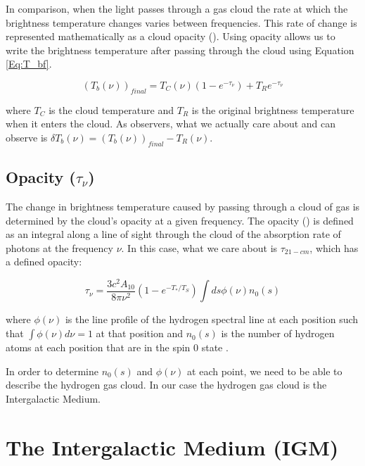 In comparison, when the light passes through a gas cloud the rate at which the brightness temperature changes varies between frequencies. This rate of change is represented mathematically as a cloud opacity (\tu). Using opacity allows us to write the brightness temperature after passing through the cloud using Equation \ref{Eq:T_bf}. 

\begin{equation}\label{Eq:T_bf}
(T_b (\nu))_{final}= T_{C} (\nu) (1-e^{-\tau_\nu}) +T_{R} e^{-\tau_\nu}
\end{equation}

where $T_{C}$ is the cloud temperature and $T_{R}$ is the original brightness temperature when it enters the cloud. As observers, what we actually care about and can observe is $\delta T_b (\nu) = (T_b (\nu))_{final} - T_R  (\nu)$. 


\subsection{Opacity ($\tau_\nu$)}

The change in brightness temperature caused by passing through a cloud of gas is determined by the cloud's opacity at a given frequency. The opacity (\tu) is defined as an integral along a line of sight through the cloud of the absorption rate of photons at the frequency $\nu$. In this case, what we care about is $\tau_{21-cm}$, which has a defined opacity:

\begin{equation} \label{Eq:tau}
\tau_{\nu} = \frac{3 c^2 A_{10}}{8 \pi \nu^2 } (1-e^{-T_*/T_S}) \int ds \phi (\nu) n_0(s)
\end{equation}

where $\phi (\nu)$ is the line profile of the hydrogen \cm spectral line at each position such that $\int \phi(\nu) d \nu = 1$ at that position and $n_0 (s)$ is the number of hydrogen atoms at each position that are in the spin 0 state \cite{furlanetto_2006}. 

In order to determine $n_0 (s)$ and $\phi (\nu)$ at each point, we need to be able to describe the hydrogen gas cloud. In our case the hydrogen gas cloud is the Intergalactic Medium. 



\section{The Intergalactic Medium (IGM)}\label{Sec:IGM}


